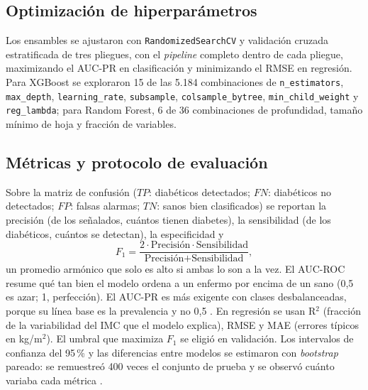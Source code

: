\documentclass[conference,a4paper]{IEEEtran}
\begin{document}
\subsection{Optimización de hiperparámetros}
Los ensambles se ajustaron con \texttt{RandomizedSearchCV} \citep{bergstra2012} y validación cruzada estratificada de tres pliegues, con el \textit{pipeline} completo dentro de cada pliegue, maximizando el AUC-PR en clasificación y minimizando el RMSE en regresión. Para XGBoost se exploraron 15 de las 5.184 combinaciones de \texttt{n\_estimators}, \texttt{max\_depth}, \texttt{learning\_rate}, \texttt{subsample}, \texttt{colsample\_bytree}, \texttt{min\_child\_weight} y \texttt{reg\_lambda}; para Random Forest, 6 de 36 combinaciones de profundidad, tamaño mínimo de hoja y fracción de variables.

\subsection{Métricas y protocolo de evaluación}
Sobre la matriz de confusión ($TP$: diabéticos detectados; $FN$: diabéticos no detectados; $FP$: falsas alarmas; $TN$: sanos bien clasificados) se reportan la precisión (de los señalados, cuántos tienen diabetes), la sensibilidad (de los diabéticos, cuántos se detectan), la especificidad y
\begin{equation}
F_1=\frac{2\cdot\text{Precisión}\cdot\text{Sensibilidad}}{\text{Precisión}+\text{Sensibilidad}} ,
\end{equation}
un promedio armónico que solo es alto si ambas lo son a la vez. El AUC-ROC resume qué tan bien el modelo ordena a un enfermo por encima de un sano (0,5 es azar; 1, perfección). El AUC-PR es más exigente con clases desbalanceadas, porque su línea base es la prevalencia y no 0,5 \citep{saito2015}. En regresión se usan R$^2$ (fracción de la variabilidad del IMC que el modelo explica), RMSE y MAE (errores típicos en kg/m$^2$). El umbral que maximiza $F_1$ se eligió en validación. Los intervalos de confianza del 95\,\% y las diferencias entre modelos se estimaron con \textit{bootstrap} pareado: se remuestreó 400 veces el conjunto de prueba y se observó cuánto variaba cada métrica \citep{efron1993}.
\end{document}
